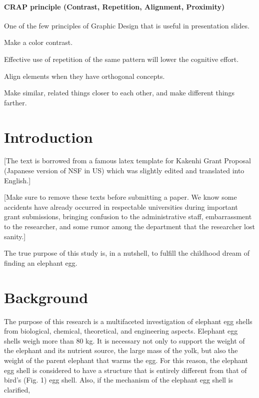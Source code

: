 \paragraph{CRAP principle (Contrast, Repetition, Alignment, Proximity)}

One of the few principles of Graphic Design that is useful in presentation slides.

Make a color contrast.

Effective use of repetition of the same pattern
will lower the cognitive effort.

Align elements when they have orthogonal concepts.

Make similar, related things closer to each other,
and make different things farther.





\section{Introduction}

[The text is borrowed from a famous latex template for Kakenhi Grant
Proposal (Japanese version of NSF in US) which was slightly edited and translated into English.]

[Make sure to remove these texts before submitting a paper.
We know some accidents have already occurred in respectable universities during important grant submissions,
bringing confusion to the administrative staff, embarrassment to the researcher,
and some rumor among the department that the researcher lost sanity.]


The true purpose of this study is, in a nutshell, to fulfill the childhood dream of finding an elephant egg.

\section{Background}

The purpose of this research is
a multifaceted investigation of elephant egg shells from biological, chemical, theoretical, and engineering aspects.
Elephant egg shells weigh more than 80 kg.
It is necessary not only to support the weight of the elephant and its
nutrient source, the large mass of the yolk, but also the weight of the
parent elephant that warms the egg. For this reason, the elephant egg
shell is considered to have a structure that is entirely different
from that of bird's (Fig. 1) egg shell. Also, if the mechanism
of the elephant egg shell is clarified,

